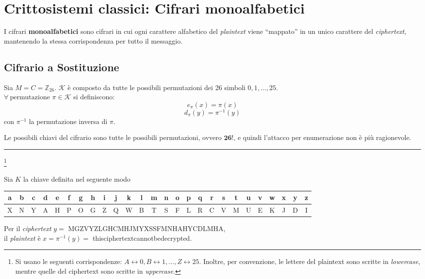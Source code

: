 \section{Crittosistemi classici: Cifrari \textbf{monoalfabetici}}
I cifrari \textbf{monoalfabetici} sono cifrari in cui ogni carattere alfabetico del \textit{plaintext} viene ``mappato'' in un unico carattere del \textit{ciphertext}, mantenendo la stessa corrispondenza per tutto il messaggio.


\subsection{Cifrario a Sostituzione}
        Sia $M = C = \mathbb{Z}_{26}$. $\mathcal{K}$ è composto da tutte le possibili permutazioni dei 26 simboli $0,1, \dots, 25$.\\
        $\forall \ \text{permutazione } \pi  \in \mathcal{K}$ si definiscono:
        \[ e_{\pi}(x) = \pi(x) \]
        \[ d_{\pi}(y) = \pi^{-1}(y)\]
        con $\pi^{-1}$ la permutazione inversa di $\pi$.
    
    \vspace{1em} \noindent Le possibili chiavi del cifrario sono tutte le possibili permutazioni, ovvero $\textbf{26!}$, e quindi l'attacco per enumerazione non è più ragionevole.
    
    \vspace{1em}
    \hrule
    \begin{example}
        \footnote{ Si usano le seguenti corrispondenze: $A \leftrightarrow 0, B \leftrightarrow 1, \dots, Z \leftrightarrow 25$. Inoltre, per convenzione, le lettere del plaintext sono scritte in \textit{lowercase}, mentre quelle del ciphertext sono scritte in \textit{uppercase}.}


    Sia $K$ la chiave definita nel seguente modo
    \begin{table}[h]
        \begin{tabular}{c*{25}{|c}}
            a & b & c & d & e & f & g & h & i & j & k & l & m & n & o & p & q & r & s & t & u & v & w & x & y & z \\
            \hline
            X & N & Y & A & H & P & O & G & Z & Q & W & B & T & S & F & L & R & C & V & M & U & E & K & J & D & I
        \end{tabular}
    \end{table}

    \noindent Per il \textit{ciphertext} $y =$ MGZVYZLGHCMHJMYXSSFMNHAHYCDLMHA,\\ il \textit{plaintext} è $x = \pi^{-1}(y) = $ thisciphertextcannotbedecrypted. 
    \end{example}
    
